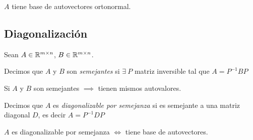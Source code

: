 \begin{coro}
	$A$ tiene base de autovectores ortonormal.
\end{coro}

\subsection{Diagonalización}
Sean $A \in\mathbb{R}^{m\times n}$, $B \in\mathbb{R}^{m\times n}$.

\begin{defi}
	Decimos que $A$ y $B$ son \textit{semejantes} si $\exists\ P$ matriz inversible tal que
	$A = P^{-1}BP$
\end{defi}

\begin{propi}
	Si $A$ y $B$ son semejantes $\implies$ tienen mismos autovalores.
\end{propi}

\begin{defi}
	Decimos que $A$ es \textit{diagonalizable por semejanza} si es semejante a una
	matriz diagonal $D$, es decir $A = P^{-1}DP$
\end{defi}

\begin{propi}
	$A$ es diagonalizable por semejanza $\iff$ tiene base de autovectores.
\end{propi}
